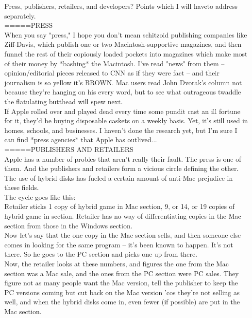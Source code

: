 \documentclass[11pt,twoside,a4paper]{article}
\begin{document}
\begin{multicols*}{2}
Press, publishers, retailers, and developers? Points which I will haveto address separately.~\\

=====PRESS~\\
When you say "press," I hope you don't mean schitzoid publishing companies like Ziff-Davis, which publish one or two Macintosh-supportive magazines, and then funnel the rest of their copiously loaded pockets into magazines which make most of their money by *bashing* the Macintosh. I've read "news" from them -- opinion/editorial pieces released to CNN as if they were fact -- and their journalism is so yellow it's BROWN. Mac users read John Dvorak's column not because they're hanging on his every word, but to see what outrageous twaddle the flatulating butthead will spew next.~\\

If Apple rolled over and played dead every time some pundit cast an ill fortune for it, they'd be buying disposable caskets on a weekly basis. Yet, it's still used in homes, schools, and businesses. I haven't done the research yet, but I'm sure I can find *press agencies* that Apple has outlived...~\\

=====PUBLISHERS AND RETAILERS~\\
Apple has a number of probles that aren't really their fault. The press is one of them. And the publishers and retailers form a vicious circle defining the other. The use of hybrid disks has fueled a certain amount of anti-Mac prejudice in these fields.~\\

The cycle goes like this:~\\

Retailer sticks 1 copy of hybrid game in Mac section, 9, or 14, or 19 copies of hybrid game in section. Retailer has no way of differentiating copies in the Mac section from those in the Windows section.~\\

Now let's say that the one copy in the Mac section sells, and then someone else comes in looking for the same program -- it's been known to happen. It's not there. So he goes to the PC section and picks one up from there.~\\

Now, the retailer looks at these numbers, and figures the one from the Mac section was a Mac sale, and the ones from the PC section were PC sales. They figure not as many people want the Mac version, tell the publisher to keep the PC versions coming but cut back on the Mac version 'cos they're not selling as well, and when the hybrid disks come in, even fewer (if possible) are put in the Mac section.~\\


\end{multicols*}
\end{document}

